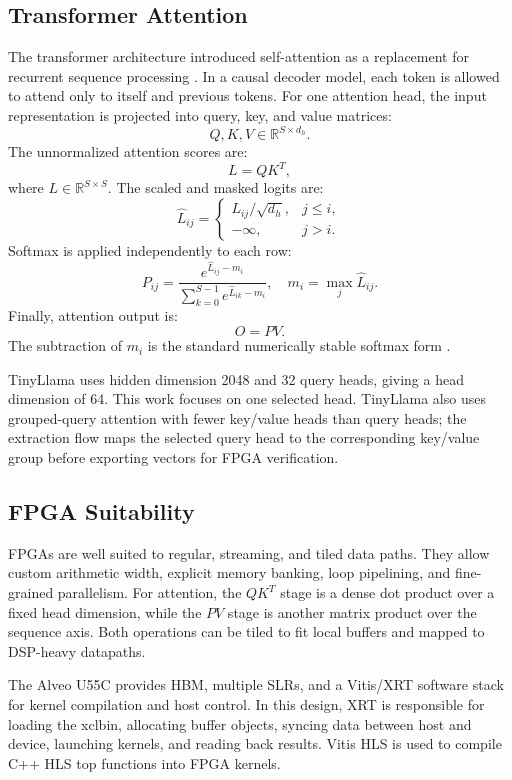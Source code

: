 \documentclass[conference]{IMSTemplate}
\begin{document}
\subsection{Transformer Attention}

The transformer architecture introduced self-attention as a replacement for
recurrent sequence processing \cite{alammar2018illustrated,leo2024math}. In a causal decoder
model, each token is allowed to attend only to itself and previous tokens. For
one attention head, the input representation is projected into query, key, and
value matrices:
\[
    Q, K, V \in \mathbb{R}^{S \times d_h}.
\]
The unnormalized attention scores are:
\[
    L = QK^T,
\]
where \(L \in \mathbb{R}^{S \times S}\). The scaled and masked logits are:
\[
    \hat{L}_{ij} =
    \begin{cases}
    L_{ij}/\sqrt{d_h}, & j \leq i,\\
    -\infty, & j > i.
    \end{cases}
\]
Softmax is applied independently to each row:
\[
    P_{ij} = \frac{e^{\hat{L}_{ij} - m_i}}
                  {\sum_{k=0}^{S-1} e^{\hat{L}_{ik} - m_i}},
    \quad
    m_i = \max_j \hat{L}_{ij}.
\]
Finally, attention output is:
\[
    O = PV.
\]
The subtraction of \(m_i\) is the standard numerically stable softmax form
\cite{nielsen2015neural,alammar2018illustrated,leo2024math}.

TinyLlama uses hidden dimension 2048 and 32 query heads, giving a head
dimension of 64. This work focuses on one selected head. TinyLlama also uses
grouped-query attention with fewer key/value heads than query heads; the
extraction flow maps the selected query head to the corresponding key/value
group before exporting vectors for FPGA verification.

\subsection{FPGA Suitability}

FPGAs are well suited to regular, streaming, and tiled data paths. They allow
custom arithmetic width, explicit memory banking, loop pipelining, and
fine-grained parallelism. For attention, the \(QK^T\) stage is a dense dot
product over a fixed head dimension, while the \(PV\) stage is another matrix
product over the sequence axis. Both operations can be tiled to fit local
buffers and mapped to DSP-heavy datapaths.

The Alveo U55C provides HBM, multiple SLRs, and a Vitis/XRT software stack for
kernel compilation and host control. In this design,
XRT is responsible for loading the xclbin, allocating buffer objects,
syncing data between host and device, launching kernels, and reading back
results. Vitis HLS is used to compile C++ HLS top functions into FPGA kernels.
\end{document}
